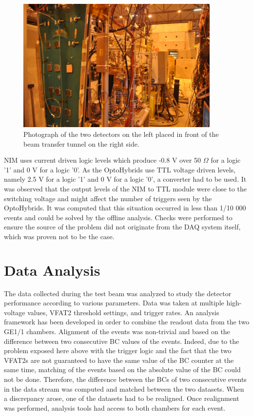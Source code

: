       \begin{figure}
        \centering
        \includegraphics[width=0.9\textwidth]{img/II-3-test-beam/test-setup.jpg}
        \caption{Photograph of the two detectors on the left placed in front of the beam transfer tunnel on the right side.}
        \label{fig:II-3-test-setup}
      \end{figure}

      NIM uses current driven logic levels which produce -0.8 V over 50 $\Omega$ for a logic '1' and 0 V for a logic '0'. As the OptoHybrids use TTL voltage driven levels, namely 2.5 V for a logic '1' and 0 V for a logic '0', a converter had to be used. It was observed that the output levels of the NIM to TTL module were close to the switching voltage and might affect the number of triggers seen by the OptoHybrids. It was computed that this situation occurred in less than 1/10 000 events and could be solved by the offline analysis. Checks were performed to ensure the source of the problem did not originate from the DAQ system itself, which was proven not to be the case.

  \section{Data Analysis}

    The data collected during the test beam was analyzed to study the detector performance according to various parameters. Data was taken at multiple high-voltage values, VFAT2 threshold settings, and trigger rates. An analysis framework has been developed in order to combine the readout data from the two GE1/1 chambers. Alignment of the events was non-trivial and based on the difference between two consecutive BC values of the events. Indeed, due to the problem exposed here above with the trigger logic and the fact that the two VFAT2s are not guaranteed to have the same value of the BC counter at the same time, matching of the events based on the absolute value of the BC could not be done. Therefore, the difference between the BCs of two consecutive events in the data stream was computed and matched between the two datasets. When a discrepancy arose, one of the datasets had to be realigned. Once realignment was performed, analysis tools had access to both chambers for each event.

